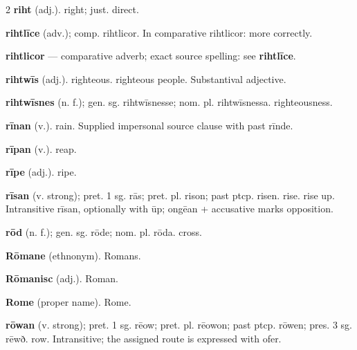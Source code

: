 \begin{multicols*}{2}
\textbf{riht} (adj.). right; just. direct.\par
\textbf{rihtlīce} (adv.); comp. rihtlicor. In comparative rihtlicor: more correctly.\par
\textbf{rihtlicor} — comparative adverb; exact source spelling: see \textbf{rihtlīce}.\par
\textbf{rihtwīs} (adj.). righteous. righteous people. Substantival adjective.\par
\textbf{rihtwīsnes} (n. f.); gen. sg. rihtwīsnesse; nom. pl. rihtwīsnessa. righteousness.\par
\textbf{rīnan} (v.). rain. Supplied impersonal source clause with past rīnde.\par
\textbf{rīpan} (v.). reap.\par
\textbf{rīpe} (adj.). ripe.\par
\textbf{rīsan} (v. strong); pret. 1 sg. rās; pret. pl. rison; past ptcp. risen. rise. rise up. Intransitive rīsan, optionally with ūp; ongēan + accusative marks opposition.\par
\textbf{rōd} (n. f.); gen. sg. rōde; nom. pl. rōda. cross.\par
\textbf{Rōmane} (ethnonym). Romans.\par
\textbf{Rōmanisc} (adj.). Roman.\par
\textbf{Rome} (proper name). Rome.\par
\textbf{rōwan} (v. strong); pret. 1 sg. rēow; pret. pl. rēowon; past ptcp. rōwen; pres. 3 sg. rēwð. row. Intransitive; the assigned route is expressed with ofer.\par

\end{multicols*}
